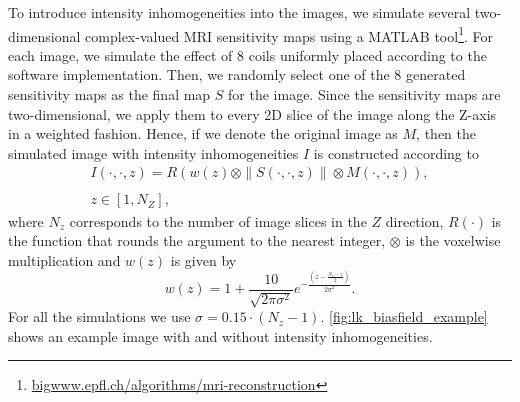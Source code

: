 To introduce intensity inhomogeneities into the images, we simulate several two-
dimensional complex-valued MRI sensitivity maps using a MATLAB
tool\footnote{\url{bigwww.epfl.ch/algorithms/mri-reconstruction}}. For each
image, we simulate the effect of 8 coils uniformly placed according to the
software implementation. Then, we randomly select one of the 8 generated
sensitivity maps as the final map $S$ for the image. Since the sensitivity maps
are two-dimensional, we apply them to every 2D slice of the image along the
Z-axis in a weighted fashion. Hence, if we denote the original image as $M$,
then the simulated image with intensity inhomogeneities $I$ is constructed
according to
\begin{equation*}
    \begin{array}{c}
        I(\cdot,\cdot,z) = R\left(w(z) \otimes \|S(\cdot,\cdot,z)\| \otimes M(\cdot,\cdot,z)\right), \\ \\ z \in [1, N_{Z}],
    \end{array}
\end{equation*}
where $N_{z}$ corresponds to the number of image slices in the $Z$ direction,
$R(\cdot)$ is the function that rounds the argument to the nearest integer,
$\otimes$ is the voxelwise multiplication and $w(z)$ is given by
\begin{equation*}
    w(z) = 1 + \frac{10}{\sqrt{2\pi\sigma^{2}}}e^{-\frac{\left(z - \frac{N_{z}-1}{2}\right)}{2\sigma^{2}}}.
\end{equation*}
For all the simulations we use $\sigma = 0.15 \cdot (N_{z} - 1)$.
\cref{fig:lk_biasfield_example} shows an example image with and without intensity
inhomogeneities.
